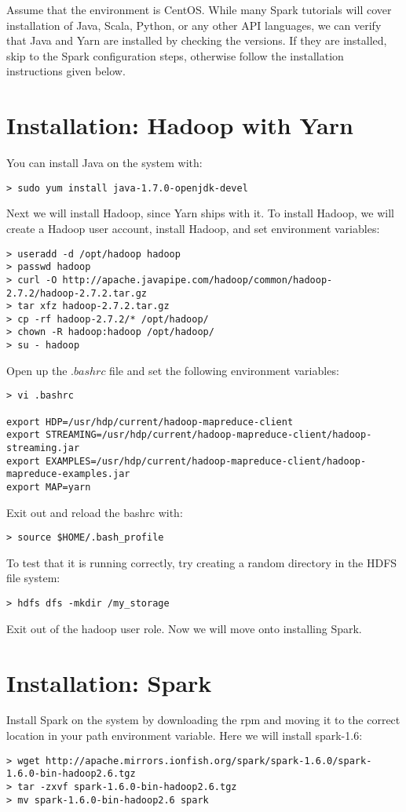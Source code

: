 \documentclass[9pt,twocolumn,twoside]{idsi}
\begin{document}
Assume that the environment is CentOS. While many Spark tutorials will cover installation of Java, Scala, Python, or any other API languages, we can verify that Java and Yarn are installed by checking the versions. If they are installed, skip to the Spark configuration steps, otherwise follow the installation instructions given below.

\section{Installation: Hadoop with Yarn}
\noindent
You can install Java on the system with:
\begin{verbatim}
> sudo yum install java-1.7.0-openjdk-devel
\end{verbatim}

\noindent
Next we will install Hadoop, since Yarn ships with it. To install Hadoop, we will create a Hadoop user account, install Hadoop, and set environment variables:

\begin{lstlisting}[breaklines]
> useradd -d /opt/hadoop hadoop
> passwd hadoop
> curl -O http://apache.javapipe.com/hadoop/common/hadoop-2.7.2/hadoop-2.7.2.tar.gz 
> tar xfz hadoop-2.7.2.tar.gz
> cp -rf hadoop-2.7.2/* /opt/hadoop/
> chown -R hadoop:hadoop /opt/hadoop/
> su - hadoop
\end{lstlisting}

Open up the $.bashrc$ file and set the following environment variables:
\begin{lstlisting}[breaklines]
> vi .bashrc

export HDP=/usr/hdp/current/hadoop-mapreduce-client
export STREAMING=/usr/hdp/current/hadoop-mapreduce-client/hadoop-streaming.jar
export EXAMPLES=/usr/hdp/current/hadoop-mapreduce-client/hadoop-mapreduce-examples.jar
export MAP=yarn
\end{lstlisting}

Exit out and reload the bashrc with:
\begin{verbatim}
> source $HOME/.bash_profile
\end{verbatim}

To test that it is running correctly, try creating a random directory in the HDFS file system:
\begin{verbatim}
> hdfs dfs -mkdir /my_storage
\end{verbatim}

Exit out of the hadoop user role. Now we will move onto installing Spark.

\section{Installation: Spark}
\noindent
Install Spark on the system by downloading the rpm and moving it to the correct location in your path environment variable. Here we will install spark-1.6:
\begin{lstlisting}[breaklines]
> wget http://apache.mirrors.ionfish.org/spark/spark-1.6.0/spark-1.6.0-bin-hadoop2.6.tgz
> tar -zxvf spark-1.6.0-bin-hadoop2.6.tgz
> mv spark-1.6.0-bin-hadoop2.6 spark
\end{lstlisting}
\end{document}
